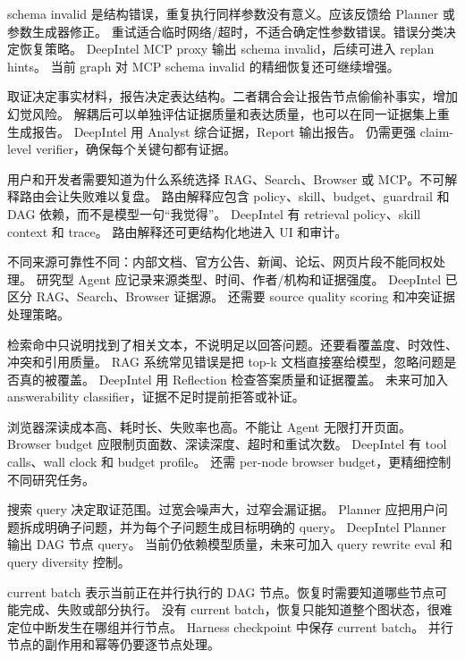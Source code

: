{schema invalid 是结构错误，重复执行同样参数没有意义。应该反馈给 Planner 或参数生成器修正。}
{重试适合临时网络/超时，不适合确定性参数错误。错误分类决定恢复策略。}
{DeepIntel MCP proxy 输出 schema invalid，后续可进入 replan hints。}
{当前 graph 对 MCP schema invalid 的精细恢复还可继续增强。}

{取证决定事实材料，报告决定表达结构。二者耦合会让报告节点偷偷补事实，增加幻觉风险。}
{解耦后可以单独评估证据质量和表达质量，也可以在同一证据集上重生成报告。}
{DeepIntel 用 Analyst 综合证据，Report 输出报告。}
{仍需更强 claim-level verifier，确保每个关键句都有证据。}

{用户和开发者需要知道为什么系统选择 RAG、Search、Browser 或 MCP。不可解释路由会让失败难以复盘。}
{路由解释应包含 policy、skill、budget、guardrail 和 DAG 依赖，而不是模型一句“我觉得”。}
{DeepIntel 有 retrieval policy、skill context 和 trace。}
{路由解释还可更结构化地进入 UI 和审计。}

{不同来源可靠性不同：内部文档、官方公告、新闻、论坛、网页片段不能同权处理。}
{研究型 Agent 应记录来源类型、时间、作者/机构和证据强度。}
{DeepIntel 已区分 RAG、Search、Browser 证据源。}
{还需要 source quality scoring 和冲突证据处理策略。}

{检索命中只说明找到了相关文本，不说明足以回答问题。还要看覆盖度、时效性、冲突和引用质量。}
{RAG 系统常见错误是把 top-k 文档直接塞给模型，忽略问题是否真的被覆盖。}
{DeepIntel 用 Reflection 检查答案质量和证据覆盖。}
{未来可加入 answerability classifier，证据不足时提前拒答或补证。}

{浏览器深读成本高、耗时长、失败率也高。不能让 Agent 无限打开页面。}
{Browser budget 应限制页面数、深读深度、超时和重试次数。}
{DeepIntel 有 tool calls、wall clock 和 budget profile。}
{还需 per-node browser budget，更精细控制不同研究任务。}

{搜索 query 决定取证范围。过宽会噪声大，过窄会漏证据。}
{Planner 应把用户问题拆成明确子问题，并为每个子问题生成目标明确的 query。}
{DeepIntel Planner 输出 DAG 节点 query。}
{当前仍依赖模型质量，未来可加入 query rewrite eval 和 query diversity 控制。}

{current batch 表示当前正在并行执行的 DAG 节点。恢复时需要知道哪些节点可能完成、失败或部分执行。}
{没有 current batch，恢复只能知道整个图状态，很难定位中断发生在哪组并行节点。}
{Harness checkpoint 中保存 current batch。}
{并行节点的副作用和幂等仍要逐节点处理。}

